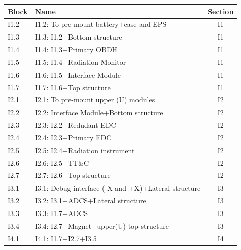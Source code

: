 \begin{table}[!htb]
\centering
\begin{tabular}{llc}
    \toprule[1.5pt]
 	\textbf{Block} & \textbf{Name} & \textbf{Section} \\
 	\midrule
    I1.2     & I1.2: To pre-mount battery+case and EPS                           & {I1} \\
	I1.3     & I1.3: I1.2+Bottom structure                                       & {I1} \\
    I1.4     & I1.4: I1.3+Primary OBDH                                           & {I1} \\
    I1.5     & I1.5: I1.4+Radiation Monitor                                      & {I1} \\
    I1.6     & I1.6: I1.5+Interface Module                                       & {I1} \\
    I1.7     & I1.7: I1.6+Top structure                                          & {I1} \\
    I2.1     & I2.1: To pre-mount upper (U) modules                              & {I2} \\
    I2.2     & I2.2: Interface Module+Bottom structure                           & {I2} \\
    I2.3     & I2.3: I2.2+Redudant EDC                                           & {I2} \\
    I2.4     & I2.4: I2.3+Primary EDC                                            & {I2} \\
    I2.5     & I2.5: I2.4+Radiation instrument                                              & {I2} \\
    I2.6     & I2.6: I2.5+TT\&C                                                  & {I2} \\
    I2.7     & I2.7: I2.6+Top structure                                          & {I2} \\
    I3.1     & I3.1: Debug interface (-X and +X)+Lateral structure               & {I3} \\
    I3.2     & I3.2: I3.1+ADCS+Lateral structure                                 & {I3} \\
    I3.3     & I3.3: I1.7+ADCS                                                   & {I3} \\
    I3.4     & I3.4: I2.7+Magnet+upper(U) top structure                          & {I3} \\
    I4.1     & I4.1: I1.7+I2.7+I3.5                                              & {I4} \\

\end{tabular}
\end{table}
